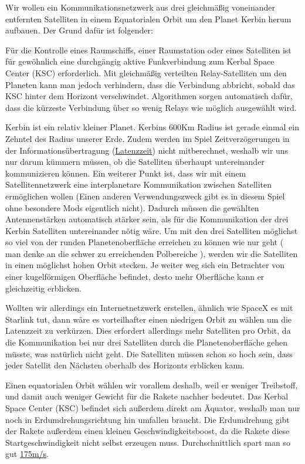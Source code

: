 \documentclass[12pt,paper=A4,numbers=noenddot,bibliography=totoc,listof=totoc,DIV=11,BCOR=1mm]{scrreprt}
\begin{document}
Wir wollen ein Kommunikationsnetzwerk aus drei gleichmäßig voneinander entfernten Satelliten in einem Equatorialen Orbit um den Planet Kerbin herum aufbauen. Der Grund dafür ist folgender:

Für die Kontrolle eines Raumschiffs, einer Raumstation oder eines Satelliten ist für gewöhnlich eine durchgängig aktive Funkverbindung zum Kerbal Space Center (KSC) erforderlich.
Mit gleichmäßig verteilten Relay-Satelliten um den Planeten kann man jedoch verhindern, dass die Verbindung abbricht, sobald das KSC hinter dem Horizont verschwindet. Algorithmen sorgen automatisch dafür, dass die kürzeste Verbindung über so wenig Relays wie möglich ausgewählt wird.

Kerbin ist ein relativ kleiner Planet. Kerbins 600Km Radius ist gerade einmal ein Zehntel des Radius unserer Erde. Zudem werden im Spiel Zeitverzögerungen in der Informationsübertragung (\href{https://www.wikiwand.com/en/Latency_(engineering)}{Latenzzeit}) nicht mitberechnet, weshalb wir uns nur darum kümmern müssen, ob die Satelliten überhaupt untereinander kommunizieren können. Ein weiterer Punkt ist, dass wir mit einem Satellitennetzwerk eine interplanetare Kommunikation zwischen Satelliten ermöglichen wollen (Einen anderen Verwendungszweck gibt es in diesem Spiel ohne besondere Mods eigentlich nicht). Dadurch müssen die gewählten Antennenstärken automatisch stärker sein, als für die Kommunikation der drei Kerbin Satelliten untereinander nötig wäre. Um mit den drei Satelliten möglichst so viel von der runden Planetenoberfläche erreichen zu können wie nur geht ( man denke an die schwer zu erreichenden Polbereiche ), werden wir die Satelliten in einen möglichst hohen Orbit stecken. Je weiter weg sich ein Betrachter von einer kugelförmigen Oberfläche befindet, desto mehr Oberfläche kann er gleichzeitig erblicken.

Wollten wir allerdings ein Internetnetzwerk erstellen, ähnlich wie SpaceX es mit Starlink tut, dann wäre es vorteilhafter einen niedrigen Orbit zu wählen um die Latenzzeit zu verkürzen. Dies erfordert allerdings mehr Satelliten pro Orbit, da die Kommunikation bei nur drei Satelliten durch die Planetenoberfläche gehen müsste, was natürlich nicht geht. Die Satelliten müssen schon so hoch sein, dass jeder Satellit den Nächsten oberhalb des Horizonts erblicken kann.

Einen equatorialen Orbit wählen wir vorallem deshalb, weil er weniger Treibstoff, und damit auch weniger Gewicht für die Rakete nachher bedeutet. Das Kerbal Space Center (KSC) befindet sich außerdem direkt am Äquator, weshalb man nur noch in Erdumdrehungsrichtung hin umfallen braucht. Die Erdumdrehung gibt der Rakete außerdem einen kleinen Geschwindigkeitsboost, da die Rakete diese Startgeschwindigkeit nicht selbst erzeugen muss. Durchschnittlich spart man so gut \href{https://wiki.kerbalspaceprogram.com/wiki/Kerbin}{175m/s}.
\end{document}
